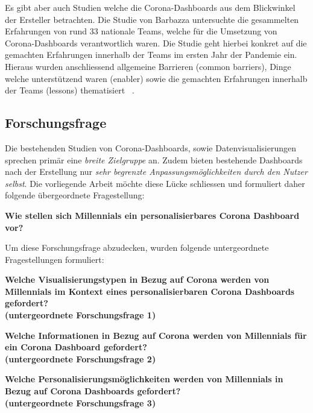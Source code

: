 \documentclass[12pt, oneside]{article}
\begin{document}
Es gibt aber auch Studien welche die Corona-Dashboards aus dem Blickwinkel der Ersteller betrachten. Die Studie von Barbazza untersuchte die gesammelten Erfahrungen von rund 33 nationale Teams, welche für die Umsetzung von Corona-Dashboards verantwortlich waren. Die Studie geht hierbei konkret auf die gemachten Erfahrungen innerhalb der Teams im ersten Jahr der Pandemie ein. Hieraus wurden anschliessend allgemeine Barrieren (common barriers), Dinge welche unterstützend waren (enabler) sowie die gemachten Erfahrungen innerhalb der Teams (lessons) thematisiert ~\citep{Barbazza.}.

\subsection{Forschungsfrage}
Die bestehenden Studien von Corona-Dashboards, sowie Datenvisualisierungen sprechen primär eine \textit{breite Zielgruppe} an. Zudem bieten bestehende Dashboards nach der Erstellung nur \textit{sehr begrenzte Anpassungsmöglichkeiten durch den Nutzer selbst}. Die vorliegende Arbeit möchte diese Lücke schliessen und formuliert daher folgende übergeordnete Fragestellung:

\begin{center}
\textbf{Wie stellen sich Millennials ein personalisierbares Corona Dashboard vor?}
\end{center}

Um diese Forschungsfrage abzudecken, wurden folgende untergeordnete Fragestellungen formuliert:

\begin{center}
\textbf{Welche Visualisierungstypen in Bezug auf Corona werden von Millennials im Kontext eines personalisierbaren Corona Dashboards gefordert?\\
(untergeordnete Forschungsfrage 1)}
\end{center}

\begin{center}
\textbf{Welche Informationen in Bezug auf Corona werden von Millennials für ein Corona Dashboard gefordert?\\
(untergeordnete Forschungsfrage 2)}
\end{center}

\begin{center}
\textbf{Welche Personalisierungsmöglichkeiten werden von Millennials in Bezug auf Corona Dashboards gefordert?\\
(untergeordnete Forschungsfrage 3)}
\end{center}
\end{document}
